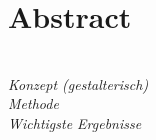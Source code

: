 \chapter*{Abstract}
\textit{
\\ Konzept (gestalterisch) 
\\ Methode  
\\ Wichtigste Ergebnisse
}
\cleardoubleemptypage